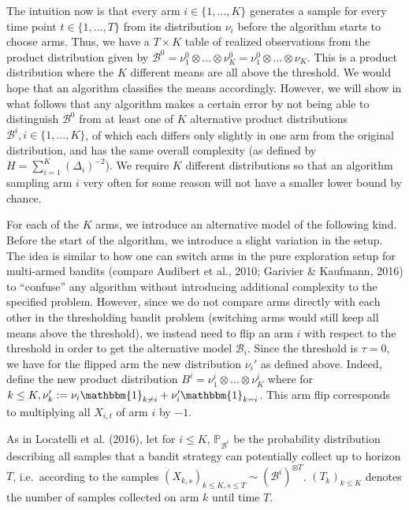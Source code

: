 \documentclass[11pt,]{article}
\begin{document}
The intuition now is that every arm \(i \in \{1,\dots,K\}\) generates a
sample for every time point \(t\in \{1, \dots, T\}\) from its
distribution \(\nu_i\) before the algorithm starts to choose arms. Thus,
we have a \(T \times K\) table of realized observations from the product
distribution given by
\(\mathcal{B}^0 = \nu_1^0 \otimes \ldots \otimes \nu_K^0 = \nu_1^0 \otimes \ldots \otimes \nu_K\).
This is a product distribution where the \(K\) different means are all
above the threshold. We would hope that an algorithm classifies the
means accordingly. However, we will show in what follows that any
algorithm makes a certain error by not being able to distinguish
\(\mathcal{B}^0\) from at least one of \(K\) alternative product
distributions \(\mathcal{B}^i, i \in \{1, \dots, K\}\), of which each
differs only slightly in one arm from the original distribution, and has
the same overall complexity (as defined by
\(H = \sum_{i=1}^K (\Delta_i)^{-2}\)). We require \(K\) different
distributions so that an algorithm sampling arm \(i\) very often for
some reason will not have a smaller lower bound by chance.

For each of the \(K\) arms, we introduce an alternative model of the
following kind. Before the start of the algorithm, we introduce a slight
variation in the setup. The idea is similar to how one can switch arms
in the pure exploration setup for multi-armed bandits (compare Audibert
et al., 2010; Garivier \& Kaufmann, 2016) to ``confuse'' any algorithm
without introducing additional complexity to the specified problem.
However, since we do not compare arms directly with each other in the
thresholding bandit problem (switching arms would still keep all means
above the threshold), we instead need to flip an arm \(i\) with respect
to the threshold in order to get the alternative model
\(\mathcal{B}_i\). Since the threshold is \(\tau = 0\), we have for the
flipped arm the new distribution \(\nu_i'\) as defined above. Indeed,
define the new product distribution
\(B^i = \nu_1^i \otimes \dots \otimes \nu_K^i\) where for
\(k \leq K, \nu_k' := \nu_i \mathbbm{1}_{k \neq i} + \nu_i' \mathbbm{1}_{k=i}\).
This arm flip corresponds to multiplying all \(X_{i,t}\) of arm \(i\) by
\(-1\).

As in Locatelli et al. (2016), let for \(i \leq K\),
\(\mathbb{P}_{\mathcal{B}^i}\) be the probability distribution
describing all samples that a bandit strategy can potentially collect up
to horizon \(T\), i.e.~according to the samples
\((X_{k,s})_{k\leq K, s \leq T} \sim (\mathcal{B}^i)^{\otimes T}\).
\((T_k)_{k\leq K}\) denotes the number of samples collected on arm \(k\)
until time \(T\).
\end{document}

